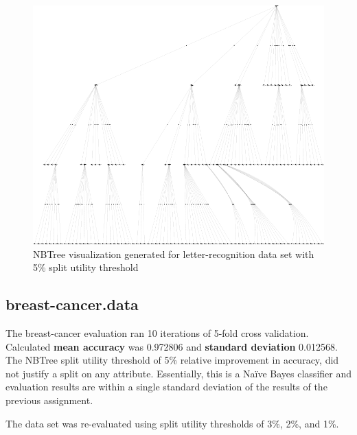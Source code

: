 \documentclass[10pt]{report}
\begin{document}
\begin{figure}
  \begin{center}
	\includegraphics[angle=90,width=!,height=\textheight]{letter-recognition}
  \end{center}
  \caption{NBTree visualization generated for letter-recognition data
    set with 5\% split utility threshold}
  \label{fig:letter-recognition}
\end{figure} 


\subsection*{breast-cancer.data}
The breast-cancer evaluation ran 10 iterations of 5-fold cross
validation. Calculated \textbf{mean accuracy} was 0.972806 and
\textbf{standard deviation} 0.012568. The NBTree split utility
threshold of 5\% relative improvement in accuracy, did not justify a
split on any attribute. Essentially, this is a Na\"{i}ve Bayes
classifier and evaluation results are within a single standard
deviation of the results of the previous assignment.

The data set was re-evaluated using split utility thresholds of 3\%,
2\%, and 1\%.






\end{document}
